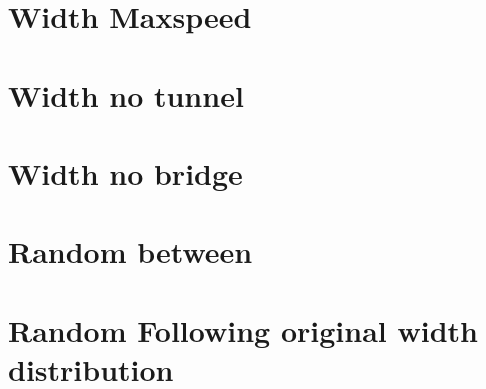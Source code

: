 \documentclass[aspectratio=169]{beamer}
\begin{document}
    \section{Width Maxspeed}

    \section{Width no tunnel}

    \section{Width no bridge}

    \section{Random between}

    \section{Random Following original width distribution}
\end{document}

